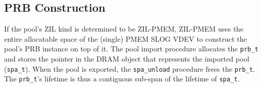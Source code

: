 \documentclass[12pt,a4paper,twoside]{book}
\begin{document}


\subsection{PRB Construction}\label{sec:zilpmem:prbconstruction}
If the pool's ZIL kind is determined to be ZIL-PMEM, ZIL-PMEM uses the entire allocatable space of the (single) PMEM SLOG VDEV to construct the pool's PRB instance on top of it.
The pool import procedure allocates the \lstinline{prb_t} and stores the pointer in the DRAM object that represents the imported pool (\lstinline{spa_t}).
When the pool is exported, the \lstinline{spa_unload} procedure frees the \lstinline{prb_t}.
The \lstinline{prb_t}'s lifetime is thus a contiguous sub-span of the lifetime of \lstinline{spa_t}.
\end{document}
